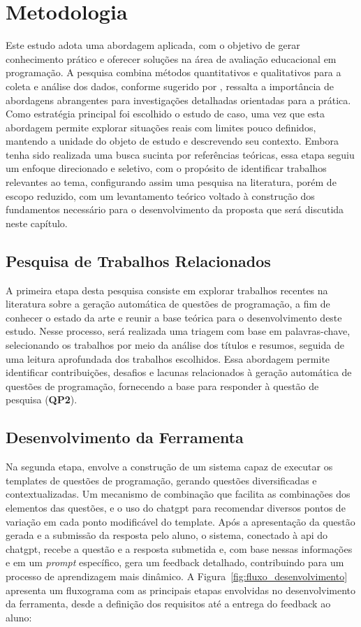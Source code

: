 \chapter{Metodologia}\label{cap:metodologia}

Este estudo adota uma abordagem aplicada, com o objetivo de gerar conhecimento prático e oferecer soluções na área de avaliação educacional em programação. A pesquisa combina métodos quantitativos e qualitativos para a coleta e análise dos dados, conforme sugerido por \parencite{Gil2017},  ressalta a importância de abordagens abrangentes para investigações detalhadas orientadas para a prática. Como estratégia principal foi escolhido o estudo de caso, uma vez que esta abordagem permite explorar situações reais com limites pouco definidos, mantendo a unidade do objeto de estudo e descrevendo seu contexto. Embora tenha sido realizada uma busca sucinta por referências teóricas, essa etapa seguiu um enfoque direcionado e seletivo, com o propósito de identificar trabalhos relevantes ao tema, configurando assim uma pesquisa na literatura, porém  de escopo reduzido, com um levantamento teórico voltado à construção dos fundamentos necessário para o desenvolvimento da proposta que será discutida neste capítulo.

\section{Pesquisa de Trabalhos Relacionados}

A primeira etapa desta pesquisa consiste em explorar trabalhos recentes na literatura sobre a geração automática de questões de programação, a fim de conhecer o estado da arte e reunir a base teórica para o desenvolvimento deste estudo. Nesse processo, será realizada uma triagem com base em palavras-chave, selecionando os trabalhos por meio da análise dos títulos e resumos, seguida de uma leitura aprofundada dos trabalhos escolhidos. Essa abordagem permite identificar contribuições, desafios e lacunas relacionados à geração automática de questões de programação, fornecendo a base para responder à questão de pesquisa (\textbf{QP2}). 


\section{Desenvolvimento da Ferramenta}
Na segunda etapa, envolve a construção de um sistema capaz de executar os templates de questões de programação, gerando questões diversificadas e contextualizadas. Um mecanismo de combinação que facilita as combinações dos elementos das questões, e o uso do \gls{chatgpt} para recomendar diversos pontos de variação em cada ponto modificável do template. Após a apresentação da questão gerada e a submissão da resposta pelo aluno, o sistema, conectado à \gls{api} do \gls{chatgpt}, recebe a questão e a resposta submetida e, com base nessas informações e em um \textit{prompt} específico, gera um feedback detalhado, contribuindo para um processo de aprendizagem mais dinâmico. A Figura~\ref{fig:fluxo_desenvolvimento} apresenta um fluxograma com as principais etapas envolvidas no desenvolvimento da ferramenta, desde a definição dos requisitos até a entrega do feedback ao aluno:

